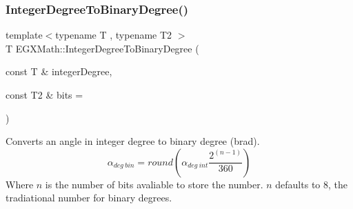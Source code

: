 \subsubsection{\texorpdfstring{Integer\+Degree\+To\+Binary\+Degree()}{IntegerDegreeToBinaryDegree()}}
{\footnotesize\ttfamily template$<$typename T , typename T2 $>$ \\
T E\+G\+X\+Math\+::\+Integer\+Degree\+To\+Binary\+Degree (\begin{DoxyParamCaption}\item[{const T \&}]{integer\+Degree,  }\item[{const T2 \&}]{bits = {} }\end{DoxyParamCaption})}



Converts an angle in integer degree to binary degree (brad). \[\alpha_{deg\ bin}=round(\alpha_{deg\ int}\frac{2^{(n-1)}}{360})\] Where $n$ is the number of bits avaliable to store the number. $n$ defaults to 8, the tradiational number for binary degrees. 

